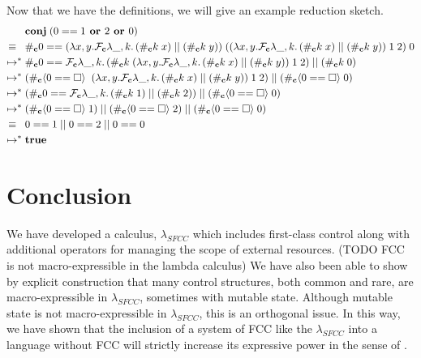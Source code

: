 \documentclass[11pt]{article}
\newcommand{\maybePage}{\newpage}
\newcommand\x{\lambda x}
\newcommand\F{\mathcal{F}}
\newcommand{\angles}[1]{\langle#1\rangle}
\begin{document}
Now that we have the definitions, we will give an example reduction sketch.
\begin{align*}
&\textbf{conj}\;(0 == 1\textbf{ or }2\textbf{ or }0) \\
\equiv{}\;\;& \#_\textbf c 0 ==
	(\x,y. \F_\textbf{c}\lambda \_, k.\,(\#_\textbf{c}k\;x)\;||\;(\#_\textbf{c}k\;y))
		\;((\x,y. \F_\textbf{c}\lambda \_, k.\,(\#_\textbf{c}k\;x)\;||\;(\#_\textbf{c}k\;y))
			\;1\;2)
		\;0 \\
%
\mapsto^*{}& \#_\textbf c 0 == \F_\textbf{c}\lambda \_, k.\,(\#_\textbf{c}k\;(\x,y. \F_\textbf{c}\lambda \_, k.\,(\#_\textbf{c}k\;x)\;||\;(\#_\textbf{c}k\;y))
			\;1\;2)\;||\;(\#_\textbf{c}k\;0)\\
%
\mapsto^*{}& (\#_\textbf{c}\angles{0==\square}\;\;(\x,y. \F_\textbf{c}\lambda \_, k.\,(\#_\textbf{c}k\;x)\;||\;(\#_\textbf{c}k\;y))
			\;1\;2)\;||\;(\#_\textbf{c}\angles{0==\square}\;0)\\
%
\mapsto^*{}& (\#_\textbf c 0==\F_\textbf{c}\lambda \_, k.\,(\#_\textbf c k\;1)\;||\;(\#_\textbf c k\;2))
			\;||\;(\#_\textbf c \angles{0==\square}\;0)\\
%
\mapsto^*{}& (\#_\textbf c \angles{0==\square}\;1)\;||\;(\#_\textbf c \angles{0==\square}\;2)\;||\;(\#_\textbf c \angles{0==\square}\;0)\\
\equiv{}\;\;& 0==1\;||\;0==2\;||\;0==0\\
%
\mapsto^*{}& \textbf{true}
\end{align*}

\maybePage
\section{Conclusion}

We have developed a calculus, $\lambda_{SFCC}$ which includes first-class control along with additional operators for managing the scope of external resources.
(TODO FCC is not macro-expressible in the lambda calculus)
We have also been able to show by explicit construction that many control structures, both common and rare, are macro-expressible in $\lambda_{SFCC}$, sometimes with mutable state.
Although mutable state is not macro-expressible in $\lambda_{SFCC}$, this is an orthogonal issue.
In this way, we have shown that the inclusion of a system of FCC like the $\lambda_{SFCC}$ into a language without FCC will strictly increase its expressive power in the sense of \cite{Felleisen90expressive}.
\end{document}
